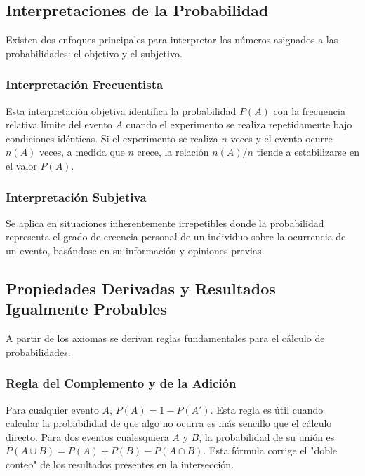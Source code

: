 \documentclass[a4paper]{article}
\begin{document}
\subsection{Interpretaciones de la Probabilidad}

Existen dos enfoques principales para interpretar los números asignados a las probabilidades: el objetivo y el subjetivo.

\subsubsection{Interpretación Frecuentista}

Esta interpretación objetiva identifica la probabilidad $P(A)$ con la frecuencia relativa límite del evento $A$ cuando el experimento se realiza repetidamente bajo condiciones idénticas. Si el experimento se realiza $n$ veces y el evento ocurre $n(A)$ veces, a medida que $n$ crece, la relación $n(A)/n$ tiende a estabilizarse en el valor $P(A)$.

\subsubsection{Interpretación Subjetiva}

Se aplica en situaciones inherentemente irrepetibles donde la probabilidad representa el grado de creencia personal de un individuo sobre la ocurrencia de un evento, basándose en su información y opiniones previas.

\subsection{Propiedades Derivadas y Resultados Igualmente Probables}

A partir de los axiomas se derivan reglas fundamentales para el cálculo de probabilidades.

\subsubsection{Regla del Complemento y de la Adición}

Para cualquier evento $A$, $P(A) = 1 - P(A')$. Esta regla es útil cuando calcular la probabilidad de que algo no ocurra es más sencillo que el cálculo directo. Para dos eventos cualesquiera $A$ y $B$, la probabilidad de su unión es $P(A \cup B) = P(A) + P(B) - P(A \cap B)$. Esta fórmula corrige el "doble conteo" de los resultados presentes en la intersección.
\end{document}
